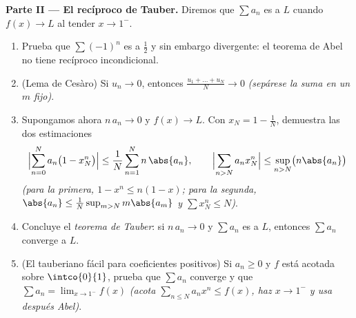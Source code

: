\begin{problem}
\medskip
\noindent\textbf{Parte II --- El recíproco de Tauber.} Diremos que
$\sum a_n$ es \emph{} a $L$ cuando $f(x) \to L$ al
tender $x \to 1^-$.
\begin{enumerate}[resume]
  \item Prueba que $\sum (-1)^n$ es  a $\frac12$ y sin
        embargo divergente: el teorema de Abel no tiene recíproco
        incondicional.
  \item (Lema de Cesàro) Si $u_n \to 0$, entonces $\frac{u_1 +
        \dots + u_N}{N} \to 0$ \emph{(sepárese la suma en un $m$
        fijo)}.
  \item Supongamos ahora $n\,a_n \to 0$ y $f(x) \to L$. Con $x_N = 1
        - \frac1N$, demuestra las dos estimaciones
        \[
        \Bigl|\sum_{n=0}^{N} a_n\bigl(1 - x_N^n\bigr)\Bigr|
        \leq \frac{1}{N}\sum_{n=1}^{N} n\,\abs{a_n},
        \qquad
        \Bigl|\sum_{n>N} a_n x_N^n\Bigr|
        \leq \sup_{n>N}\bigl(n\abs{a_n}\bigr)
        \]
        \emph{(para la primera, $1 - x^n \leq n(1-x)$; para la
        segunda, $\abs{a_n} \leq \frac{1}{N}\sup_{m>N} m\abs{a_m}$ y
        $\sum x_N^n \leq N$)}.
  \item Concluye el \emph{teorema de Tauber}: si $n\,a_n \to 0$ y
        $\sum a_n$ es  a $L$, entonces $\sum a_n$
        converge a $L$.
  \item (El tauberiano fácil para coeficientes positivos) Si $a_n
        \geq 0$ y $f$ está acotada sobre $\intco{0}{1}$, prueba que
        $\sum a_n$ converge y que $\sum a_n = \lim_{x\to1^-} f(x)$
        \emph{(acota $\sum_{n\leq N}a_nx^n \leq f(x)$, haz $x \to
        1^-$ y usa después Abel)}.
\end{enumerate}


\end{problem}
